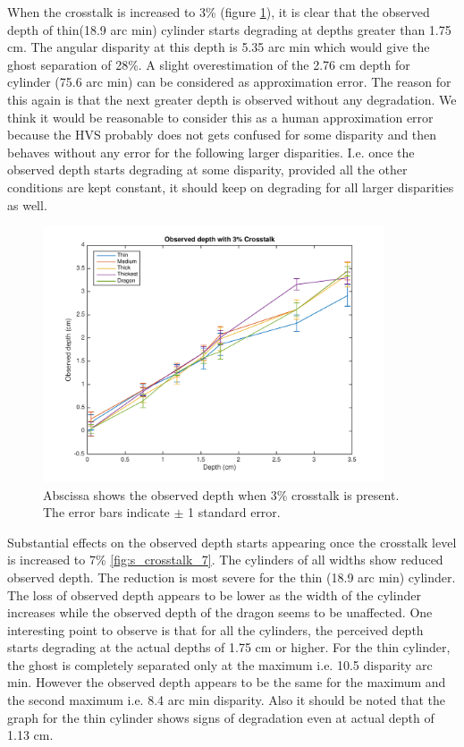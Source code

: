 When the crosstalk is increased to 3\% (figure \ref{fig:s_crosstalk_3}), it is clear that the observed depth of thin(18.9 arc min) cylinder starts degrading at depths greater than 1.75 cm. The angular disparity at this depth is 5.35 arc min which would give the ghost separation of 28\%. A slight overestimation of the 2.76 cm depth for cylinder (75.6 arc min) can be considered as approximation error. The reason for this again is that the next greater depth is observed without any degradation. We think it would be reasonable to consider this as a human approximation error because the HVS probably does not gets confused for some disparity and then behaves without any error for the following larger disparities. I.e. once the observed depth starts degrading at some disparity, provided all the other conditions are kept constant, it should keep on degrading for all larger disparities as well.
\begin{figure}[H]
\centering
    \includegraphics[width=0.9\textwidth]{./Template_Figures/s_crosstalk_3}
    \caption{Abscissa shows the observed depth when 3\% crosstalk is present. The error bars indicate $\pm$ 1 standard error.\label{fig:s_crosstalk_3}}
\end{figure}

Substantial effects on the observed depth starts appearing once the crosstalk level is increased to 7\% \ref{fig:s_crosstalk_7}. The cylinders of all widths show reduced observed depth. The reduction is most severe for the thin (18.9 arc min) cylinder. The loss of observed depth appears to be lower as the width of the cylinder increases while the observed depth of the dragon seems to be unaffected. One interesting point to observe is that for all the cylinders, the perceived depth starts degrading at the actual depths of 1.75 cm or higher. For the thin cylinder, the ghost is completely separated only at the maximum i.e. 10.5 disparity arc min. However the observed depth appears to be the same for the maximum and the second maximum i.e. 8.4 arc min disparity. Also it should be noted that the graph for the thin cylinder shows signs of degradation even at actual depth of 1.13 cm.

